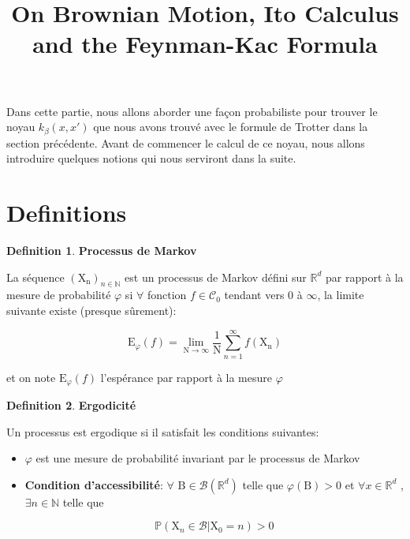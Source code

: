 \documentclass[11pt]{article}
\title{On Brownian Motion, Ito Calculus and the Feynman-Kac Formula}
\theoremstyle{definition}
\newtheorem{definition}{Definition}[section]
\theoremstyle{remark}
\begin{document}
 
\maketitle 

Dans cette partie, nous allons aborder une façon probabiliste pour trouver le noyau $k_{\beta}(x, x')$ que nous avons trouvé avec le formule de Trotter dans la section précédente. Avant de commencer le calcul de ce noyau, nous allons introduire quelques notions qui nous serviront dans la suite. 

\section{Definitions}

\theoremstyle{definition}

\begin{definition}{\textbf{Processus de Markov}}

La séquence $(\mathrm{X_n})_{n \in \mathbb{N}}$ est un processus de Markov défini sur $\mathbb{R} ^ {d}$ par rapport à la mesure de probabilité $\varphi$ si $\forall$ fonction $f \in \mathcal{C}_{0}$ tendant vers 0 à $\infty$, la limite suivante existe (presque sûrement): 

\[ \mathrm{E}_{\varphi}(f) = \lim_{\mathrm{N}\to\infty} \frac{1}{\mathrm{N}} \sum_{n=1}^{\infty} f(\mathrm{X_n}) \]

et on note $\mathrm{E}_{\varphi}(f)$ l’espérance par rapport à la mesure $\varphi$

\end{definition}

\begin{definition}{\textbf{Ergodicité}}

Un processus est ergodique si il satisfait les conditions suivantes:

\begin{itemize}

\item 

$\varphi$ est une mesure de probabilité invariant par le processus de Markov 

\item 

\textbf{Condition d'accessibilité}: $\forall$ $\mathrm{B} \in \mathcal{B}(\mathbb{R}^d)$ telle que $\varphi(\mathrm{B}) > 0$ et $\forall x \in \mathbb{R}^d$ , $\exists n \in \mathbb{N}$ telle que

\begin{equation}
\label{condition_access}
\mathbb{P}(\mathrm{X}_n \in \mathcal{B} | \mathrm{X}_0 =n ) > 0
\end{equation}

\end{itemize}

\end{definition}
\end{document}
